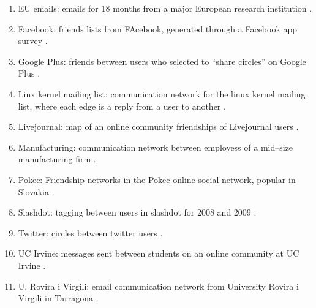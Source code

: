 \documentclass[3p,times]{elsarticle}
\begin{document}
\begin{enumerate}
    \item EU emails: emails for 18 months from a major European research institution \cite{EU}.
    
    \item Facebook: friends lists from FAcebook, generated through a Facebook app survey \cite{facebook}.
    
    \item Google Plus: friends between users who selected to ``share circles'' on Google Plus \cite{facebook}.
    
    \item Linx kernel mailing list: communication network for the linux kernel mailing list, where each edge is a reply from a user to another \cite{linux}.

    \item Livejournal: map of an online community friendships of Livejournal users \cite{livejournal}.

    \item Manufacturing: communication network between employess of a mid--size manufacturing firm \cite{manufacturing}.
    
    \item Pokec: Friendship networks in the Pokec online social network, popular in Slovakia \cite{pokec}.
    
    \item Slashdot: tagging between users in slashdot for 2008 and 2009 \cite{livejournal}.
    
    \item Twitter: circles between twitter users \cite{facebook}.
    
    \item UC Irvine: messages sent between students on an online community at UC Irvine \cite{irvine}.
 
    \item U. Rovira i Virgili: email communication network from University Rovira i Virgili in Tarragona \cite{URV}.


    


\end{enumerate}
\end{document}
